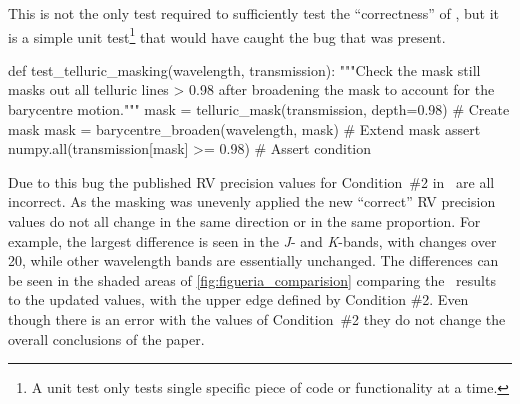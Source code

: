This is not the only test required to sufficiently test the ``correctness'' of , but it is a simple unit test\footnote{A unit test only tests single specific piece of code or functionality at a time.} that would have caught the bug that was present.
\begin{python}[caption={Example unit test to catch the masking bug.\ The assert statement checks that the mask continues to remove all telluric lines deeper than 2\%.}, label={lst:masking_unit_test}]
def test_telluric_masking(wavelength, transmission):
    """Check the mask still masks out all telluric lines > 0.98 after
    broadening the mask to account for the barycentre motion."""
    mask = telluric_mask(transmission, depth=0.98)  # Create mask
    mask = barycentre_broaden(wavelength, mask)     # Extend mask
    assert numpy.all(transmission[mask] >= 0.98)    # Assert condition
\end{python}
Due to this bug the published {RV} precision values for Condition~\#2 in~\citet{figueira_radial_2016} are all incorrect.
As the masking was unevenly applied the new ``correct'' {RV} precision values do not all change in the same direction or in the same proportion.
For example, the largest difference is seen in the \emph{J}- and \emph{K}-bands, with changes over 20\mps{}, while other wavelength bands are essentially unchanged.
The differences can be seen in the shaded areas of \cref{fig:figueria_comparision} comparing the~\citet{figueira_radial_2016} results to the updated values, with the upper edge defined by Condition \#2.
Even though there is an error with the values of Condition~\#2 they do not change the overall conclusions of the paper.
